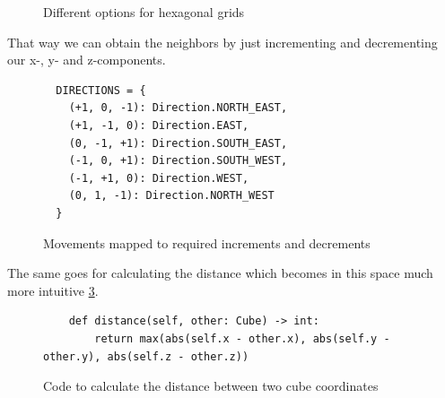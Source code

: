 \documentclass{llncs}
\begin{document}
\begin{figure}[!h]
  \centering
  \hfill
  \caption{Different options for hexagonal grids \cite{noauthor_red_nodate}}
  \label{hex_grids}
\end{figure}

That way we can obtain the neighbors by just incrementing and decrementing our x-, y- and z-components.

\begin{figure}
  \begin{lstlisting}
  DIRECTIONS = {
    (+1, 0, -1): Direction.NORTH_EAST,
    (+1, -1, 0): Direction.EAST,
    (0, -1, +1): Direction.SOUTH_EAST,
    (-1, 0, +1): Direction.SOUTH_WEST,
    (-1, +1, 0): Direction.WEST,
    (0, 1, -1): Direction.NORTH_WEST
  }
\end{lstlisting}
  \label{directions}
  \caption{Movements mapped to required increments and decrements}
\end{figure}

The same goes for calculating the distance which becomes in this space much more intuitive \ref{distance}.

\begin{figure}
  \begin{lstlisting}
    def distance(self, other: Cube) -> int:
        return max(abs(self.x - other.x), abs(self.y - other.y), abs(self.z - other.z))
\end{lstlisting}
  \label{distance}
  \caption{Code to calculate the distance between two cube coordinates \cite{noauthor_ture_nodate}}
\end{figure}
\end{document}
